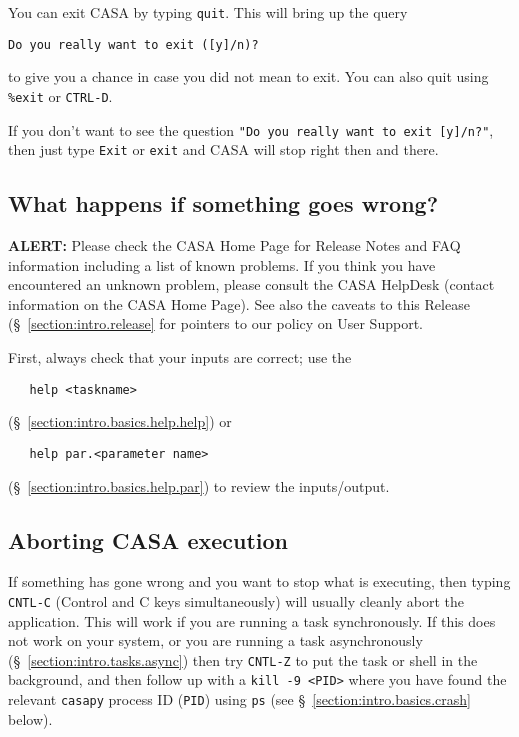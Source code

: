You can exit CASA by typing {\tt quit}.  This will bring up the
query
\small
\begin{verbatim}
Do you really want to exit ([y]/n)?
\end{verbatim}
\normalsize
to give you a chance in case you did not mean to exit.  You can
also quit using {\tt \%exit} or {\tt CTRL-D}.

If you don't want to see the question {\tt "Do you really want to exit
[y]/n?"}, then just type {\tt Exit} or {\tt exit} and CASA will stop
right then and there.

\subsection{What happens if something goes wrong?}
\label{section:intro.basics.wrong}

{\bf ALERT:} Please check the CASA Home Page for Release
Notes and FAQ information including a list of known problems.  If you think you
have encountered an unknown problem, please consult the CASA HelpDesk
(contact information on the CASA Home Page).  
See also the caveats to this Release (\S~\ref{section:intro.release} 
for pointers to our policy on User Support.

First, always check that your inputs are correct; use the
\small
\begin{verbatim}
   help <taskname>
\end{verbatim}
\normalsize
(\S~\ref{section:intro.basics.help.help}) or
\small
\begin{verbatim}
   help par.<parameter name>
\end{verbatim}
\normalsize
(\S~\ref{section:intro.basics.help.par}) to review the inputs/output.

\subsection{Aborting CASA execution}
\label{section:intro.basics.wrong.abort}

If something has gone wrong and you want to stop what is executing,
then typing {\tt CNTL-C} (Control and C keys simultaneously) will
usually cleanly abort the application. 
This will work if you are running a task synchronously.
If this does not work on your system, or you are running a task
asynchronously (\S~\ref{section:intro.tasks.async}) 
then try {\tt CNTL-Z} to put the task or shell in the
background, and then follow up with a {\tt kill -9 <PID>} where you
have found the relevant {\tt casapy} process ID ({\tt PID}) using 
{\tt ps} (see \S~\ref{section:intro.basics.crash} below).

